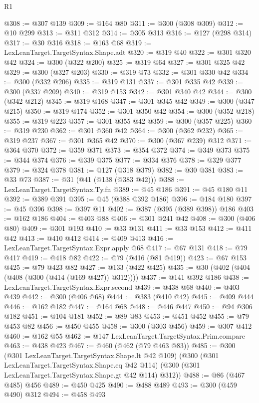 \begin{lexlean}{R1}
\begin{coremodule}
{{{{{{{{{{{{{{{{{{{{{{{{{{{{{{{{{{{{{{{{{{{{{{{{{{@308 := @307 @139
@309 := @164 @80
@311 := @300 (@308 @309)
@312 := @10 @299
@313 := @311 @312
@314 := @305 @313
@316 := @127 (@298 @314)
@317 := @30 @316
@318 := @163 @68
@319 := LexLeanTarget.TargetSyntax.Shape.adt
@320 := @319 @40
@322 := @301 @320 @42
@324 := @300 (@322 @200)
@325 := @319 @64
@327 := @301 @325 @42
@329 := @300 (@327 @203)
@330 := @319 @73
@332 := @301 @330 @42
@334 := @300 (@332 @206)
@335 := @319 @131
@337 := @301 @335 @42
@339 := @300 (@337 @209)
@340 := @319 @153
@342 := @301 @340 @42
@344 := @300 (@342 @212)
@345 := @319 @168
@347 := @301 @345 @42
@349 := @300 (@347 @215)
@350 := @319 @174
@352 := @301 @350 @42
@354 := @300 (@352 @218)
@355 := @319 @223
@357 := @301 @355 @42
@359 := @300 (@357 @225)
@360 := @319 @230
@362 := @301 @360 @42
@364 := @300 (@362 @232)
@365 := @319 @237
@367 := @301 @365 @42
@370 := @300 (@367 @239) @312
@371 := @364 @370
@372 := @359 @371
@373 := @354 @372
@374 := @349 @373
@375 := @344 @374
@376 := @339 @375
@377 := @334 @376
@378 := @329 @377
@379 := @324 @378
@381 := @127 (@318 @379)
@382 := @30 @381
@383 := @33 @73
@387 := @31 (@41 (@138 (@383 @42)))
@388 := LexLeanTarget.TargetSyntax.Ty.fn
@389 := @45 @186
@391 := @45 @180 @11
@392 := @389 @391
@395 := @45 (@388 @392 @186)
@396 := @184 @180
@397 := @45 @396
@398 := @397 @11
@402 := @387 (@395 (@389 @398)) @186
@403 := @162 @186
@404 := @403 @88
@406 := @301 @241 @42
@408 := @300 (@406 @80)
@409 := @301 @193
@410 := @33 @131
@411 := @33 @153
@412 := @411 @42
@413 := @410 @412
@414 := @409 @413
@416 := LexLeanTarget.TargetSyntax.Expr.apply @68
@417 := @67 @131
@418 := @79 @417
@419 := @418 @82
@422 := @79 (@416 (@81 @419))
@423 := @67 @153
@425 := @79 @423 @82
@427 := @133 (@422 @425)
@435 := @30 (@402 (@404 (@408 (@300 (@414 (@169 @427)) @312))))
@437 := @141 @392 @186
@438 := LexLeanTarget.TargetSyntax.Expr.second
@439 := @438 @68
@440 := @403 @439
@442 := @300 (@406 @68)
@444 := @383 (@410 @42)
@445 := @409 @444
@446 := @162 @182
@447 := @164 @68
@448 := @446 @447
@450 := @94 @306 @182
@451 := @104 @181
@452 := @89 @83
@453 := @451 @452
@455 := @79 @453 @82
@456 := @450 @455
@458 := @300 (@303 @456)
@459 := @307 @412
@460 := @162 @55
@462 := @147 LexLeanTarget.TargetSyntax.Prim.compare
@463 := @438 @423
@467 := @460 (@462 (@79 @463 @83))
@485 := @300
    (@301 LexLeanTarget.TargetSyntax.Shape.lt @42 @109)
    (@300
      (@301 LexLeanTarget.TargetSyntax.Shape.eq @42 @114)
      (@300 (@301 LexLeanTarget.TargetSyntax.Shape.gt @42 @114) @312))
@488 := @86 (@467 @485) @456
@489 := @450 @425
@490 := @488 @489
@493 := @300 (@459 @490) @312
@494 := @458 @493
}}}}}}}}}}}}}}}}}}}}}}}}}}}}}}}}}}}}}}}}}}}}}}}}}}
\end{coremodule}
\end{lexlean}
